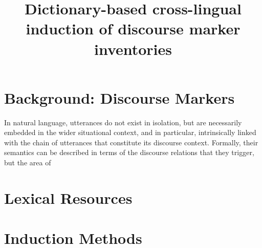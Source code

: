 

\title{Dictionary-based cross-lingual induction of discourse marker inventories}


\section{Background: Discourse Markers}

In natural language, utterances do not exist in isolation, but are necessarily embedded in the wider situational context, and in particular, intrinsically linked with the chain of utterances that constitute its discourse context. Formally, their semantics can be described in terms of the discourse relations that they trigger, but the area of 

\section{Lexical Resources}



\section{Induction Methods}








